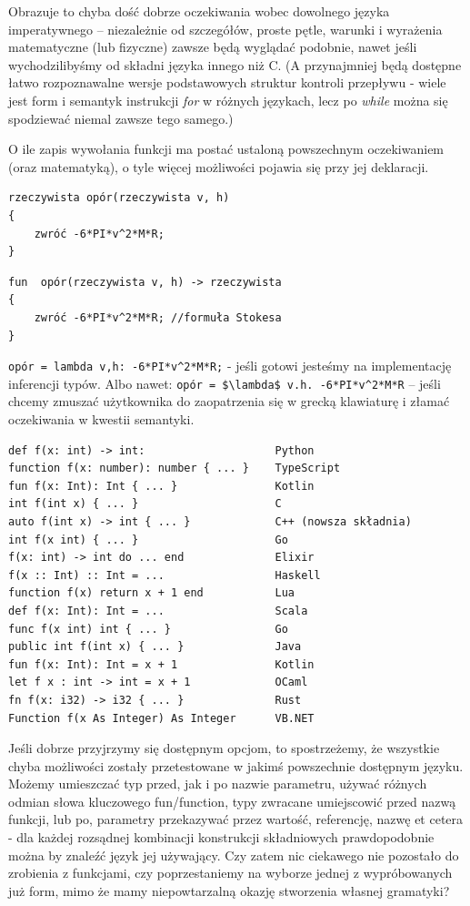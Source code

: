 Obrazuje to chyba dość dobrze oczekiwania wobec dowolnego języka imperatywnego – niezależnie od szczegółów, proste pętle, warunki i wyrażenia matematyczne (lub fizyczne) zawsze będą wyglądać podobnie, nawet jeśli wychodzilibyśmy od składni języka innego niż C. (A przynajmniej będą dostępne łatwo rozpoznawalne wersje podstawowych struktur kontroli przepływu - wiele jest form i semantyk instrukcji \textit{for} w różnych językach, lecz po \textit{while} można się spodziewać niemal zawsze tego samego.)

O ile zapis wywołania funkcji ma postać ustaloną powszechnym oczekiwaniem (oraz matematyką), o tyle więcej możliwości pojawia się przy jej deklaracji.
\begin{lstlisting}
rzeczywista opór(rzeczywista v, h)
{
	zwróć -6*PI*v^2*M*R;
}
\end{lstlisting}

\begin{lstlisting}
fun  opór(rzeczywista v, h) -> rzeczywista
{
	zwróć -6*PI*v^2*M*R; //formuła Stokesa
}
\end{lstlisting}
\lstinline[columns=fixed]{opór = lambda v,h: -6*PI*v^2*M*R;} - jeśli gotowi jesteśmy na implementację inferencji typów.
Albo nawet: \lstinline[columns=fixed, mathescape]{opór = $\lambda$ v.h. -6*PI*v^2*M*R} – jeśli chcemy zmuszać użytkownika do zaopatrzenia się w grecką klawiaturę i złamać oczekiwania w kwestii semantyki.

\lstset{
    escapechar=@
    breaklines=true
}
\begin{lstlisting}
def f(x: int) -> int:               	 Python
function f(x: number): number { ... }    TypeScript
fun f(x: Int): Int { ... }          	 Kotlin
int f(int x) { ... }                	 C
auto f(int x) -> int { ... }        	 C++ (nowsza składnia)
int f(x int) { ... }                	 Go
f(x: int) -> int do ... end         	 Elixir
f(x :: Int) :: Int = ...            	 Haskell
function f(x) return x + 1 end      	 Lua
def f(x: Int): Int = ...            	 Scala
func f(x int) int { ... }           	 Go
public int f(int x) { ... }         	 Java
fun f(x: Int): Int = x + 1          	 Kotlin
let f x : int -> int = x + 1        	 OCaml
fn f(x: i32) -> i32 { ... }         	 Rust
Function f(x As Integer) As Integer 	 VB.NET
\end{lstlisting}
\lstset{
    escapechar=|,
    breaklines=true
}
Jeśli dobrze przyjrzymy się dostępnym opcjom, to spostrzeżemy, że wszystkie chyba możliwości zostały przetestowane w jakimś powszechnie dostępnym języku. Możemy umieszczać typ przed, jak i po nazwie parametru, używać różnych odmian słowa kluczowego fun/function, typy zwracane umiejscowić przed nazwą funkcji, lub po, parametry przekazywać przez wartość, referencję, nazwę et cetera - dla każdej rozsądnej kombinacji konstrukcji składniowych prawdopodobnie można by znaleźć język jej używający.
Czy zatem nic ciekawego nie pozostało do zrobienia z funkcjami, czy poprzestaniemy na wyborze jednej z wypróbowanych już form, mimo że mamy niepowtarzalną okazję stworzenia własnej gramatyki? %

